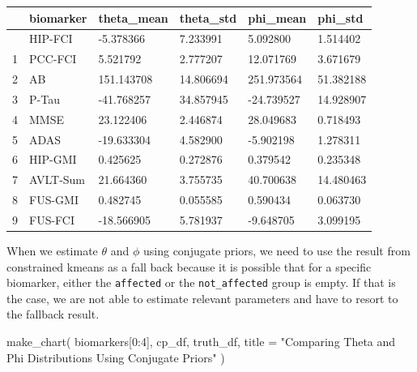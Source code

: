 \documentclass[
  letterpaper,
  DIV=11,
  numbers=noendperiod]{scrreprt}
\newenvironment{Shaded}{\begin{snugshade}}{\end{snugshade}}
\newcommand{\DecValTok}[1]{\textcolor[rgb]{0.68,0.00,0.00}{#1}}
\newcommand{\NormalTok}[1]{\textcolor[rgb]{0.00,0.23,0.31}{#1}}
\newcommand{\OperatorTok}[1]{\textcolor[rgb]{0.37,0.37,0.37}{#1}}
\newcommand{\StringTok}[1]{\textcolor[rgb]{0.13,0.47,0.30}{#1}}
\begin{document}
\begin{longtable}[]{@{}llllll@{}}
\toprule\noalign{}
& biomarker & theta\_mean & theta\_std & phi\_mean & phi\_std \\
\midrule\noalign{}
\endhead
\bottomrule\noalign{}
\endlastfoot
0 & HIP-FCI & -5.378366 & 7.233991 & 5.092800 & 1.514402 \\
1 & PCC-FCI & 5.521792 & 2.777207 & 12.071769 & 3.671679 \\
2 & AB & 151.143708 & 14.806694 & 251.973564 & 51.382188 \\
3 & P-Tau & -41.768257 & 34.857945 & -24.739527 & 14.928907 \\
4 & MMSE & 23.122406 & 2.446874 & 28.049683 & 0.718493 \\
5 & ADAS & -19.633304 & 4.582900 & -5.902198 & 1.278311 \\
6 & HIP-GMI & 0.425625 & 0.272876 & 0.379542 & 0.235348 \\
7 & AVLT-Sum & 21.664360 & 3.755735 & 40.700638 & 14.480463 \\
8 & FUS-GMI & 0.482745 & 0.055585 & 0.590434 & 0.063730 \\
9 & FUS-FCI & -18.566905 & 5.781937 & -9.648705 & 3.099195 \\
\end{longtable}

\begin{tcolorbox}[enhanced jigsaw, bottomrule=.15mm, colback=white, bottomtitle=1mm, titlerule=0mm, arc=.35mm, breakable, rightrule=.15mm, opacityback=0, leftrule=.75mm, opacitybacktitle=0.6, colframe=quarto-callout-note-color-frame, coltitle=black, toptitle=1mm, colbacktitle=quarto-callout-note-color!10!white, title=\textcolor{quarto-callout-note-color}{\faInfo}\hspace{0.5em}{Note}, left=2mm, toprule=.15mm]

When we estimate \(\theta\) and \(\phi\) using conjugate priors, we need
to use the result from constrained kmeans as a fall back because it is
possible that for a specific biomarker, either the \texttt{affected} or
the \texttt{not\_affected} group is empty. If that is the case, we are
not able to estimate relevant parameters and have to resort to the
fallback result.

\end{tcolorbox}

\begin{Shaded}
\begin{Highlighting}[]
\NormalTok{make\_chart(}
\NormalTok{    biomarkers[}\DecValTok{0}\NormalTok{:}\DecValTok{4}\NormalTok{], }
\NormalTok{    cp\_df, }
\NormalTok{    truth\_df, }
\NormalTok{    title }\OperatorTok{=} \StringTok{"Comparing Theta and Phi Distributions Using Conjugate Priors"}
\NormalTok{)}
\end{Highlighting}
\end{Shaded}
\end{document}
